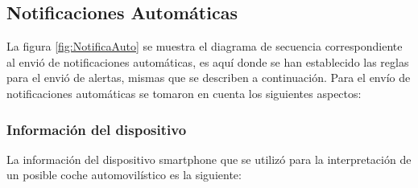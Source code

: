 \subsection{Notificaciones Automáticas}

La figura \ref{fig:NotificaAuto} se muestra el diagrama de secuencia correspondiente al envió de notificaciones automáticas, es aquí donde se han establecido las reglas para el envió de alertas, mismas que se describen a continuación. Para el envío de notificaciones automáticas se tomaron en cuenta los siguientes aspectos:

\subsubsection{Información del dispositivo}

La información del dispositivo smartphone que se utilizó para la interpretación de un posible coche automovilístico es la siguiente:
